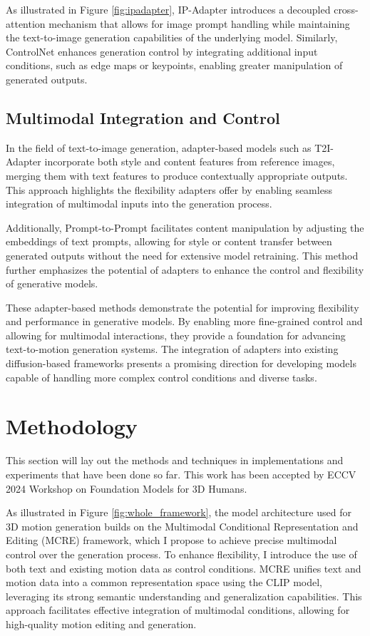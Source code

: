 \documentclass[a4paper, 12pt]{article}
\begin{document}
As illustrated in Figure \ref{fig:ipadapter}, IP-Adapter \cite{ye2023ip} introduces a decoupled cross-attention mechanism that allows for image prompt handling while maintaining the text-to-image generation capabilities of the underlying model. Similarly, ControlNet \cite{zhang2023adding} enhances generation control by integrating additional input conditions, such as edge maps or keypoints, enabling greater manipulation of generated outputs.

\subsection{Multimodal Integration and Control}
In the field of text-to-image generation, adapter-based models such as T2I-Adapter \cite{mou2024t2i} incorporate both style and content features from reference images, merging them with text features to produce contextually appropriate outputs. This approach highlights the flexibility adapters offer by enabling seamless integration of multimodal inputs into the generation process.

Additionally, Prompt-to-Prompt \cite{hertz2022prompt} facilitates content manipulation by adjusting the embeddings of text prompts, allowing for style or content transfer between generated outputs without the need for extensive model retraining. This method further emphasizes the potential of adapters to enhance the control and flexibility of generative models.

These adapter-based methods demonstrate the potential for improving flexibility and performance in generative models. By enabling more fine-grained control and allowing for multimodal interactions, they provide a foundation for advancing text-to-motion generation systems. The integration of adapters into existing diffusion-based frameworks presents a promising direction for developing models capable of handling more complex control conditions and diverse tasks.

\newpage 

\section{Methodology}

This section will lay out the methods and techniques in implementations and experiments that have been done so far. This work has been accepted by ECCV 2024 Workshop on Foundation Models for 3D Humans.

As illustrated in Figure \ref{fig:whole_framework}, the model architecture used for 3D motion generation builds on the Multimodal Conditional Representation and Editing (MCRE) framework, which I propose to achieve precise multimodal control over the generation process. To enhance flexibility, I introduce the use of both text and existing motion data as control conditions. MCRE unifies text and motion data into a common representation space using the CLIP model, leveraging its strong semantic understanding and generalization capabilities. This approach facilitates effective integration of multimodal conditions, allowing for high-quality motion editing and generation.
\end{document}
